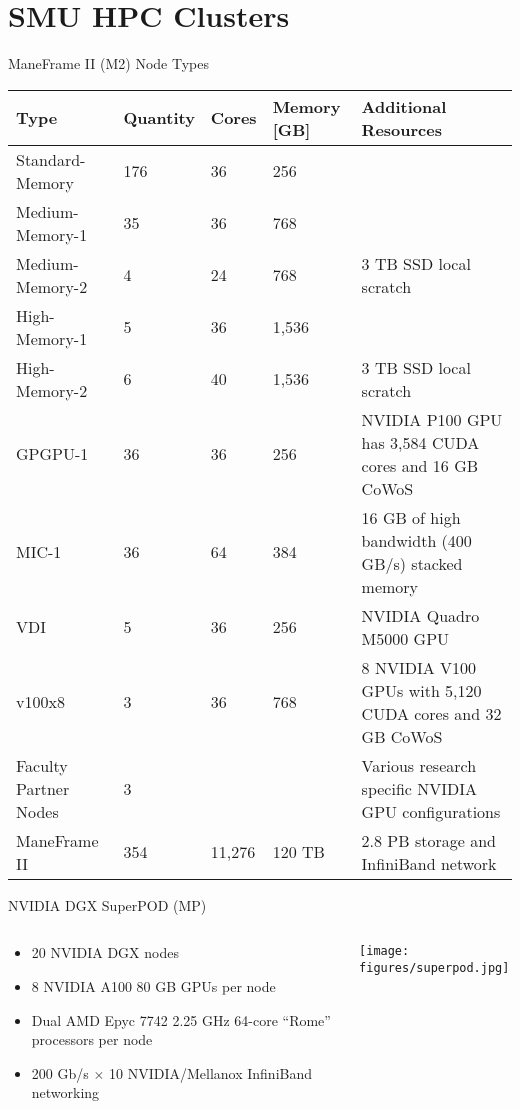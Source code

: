 \section{SMU HPC Clusters}

\begin{frame}{ManeFrame II (M2) Node Types}
\begin{table}
\tiny
\begin{tabular}{lllll}
\toprule
Type & Quantity & Cores & Memory [GB] & Additional Resources\\
\midrule
Standard-Memory & 176 & 36 & 256 & \\
Medium-Memory-1 & 35 & 36 & 768 & \\
Medium-Memory-2 & 4 & 24 & 768 & 3 TB SSD local scratch\\
High-Memory-1 & 5 & 36 & 1,536 & \\
High-Memory-2 & 6 & 40 & 1,536 & 3 TB SSD local scratch\\
GPGPU-1 & 36 & 36 & 256 & NVIDIA P100 GPU has 3,584 CUDA cores and 16 GB CoWoS\\
MIC-1 & 36 & 64 & 384 & 16 GB of high bandwidth (400 GB/s) stacked memory\\
VDI & 5 & 36 & 256 & NVIDIA Quadro M5000 GPU\\
v100x8 & 3 & 36 & 768 & 8 NVIDIA V100 GPUs with 5,120 CUDA cores and 32 GB CoWoS\\
Faculty Partner Nodes & 3 &  &  & Various research specific NVIDIA GPU configurations\\
\midrule
ManeFrame II & 354 & 11,276 & 120 TB & 2.8 PB storage and InfiniBand network\\
\bottomrule
\end{tabular}
\end{table}
\end{frame}

\begin{frame}{NVIDIA DGX SuperPOD (MP)}
\begin{columns}
\begin{column}{0.5\textwidth}
\begin{itemize}
\item 20 NVIDIA DGX nodes
\item 8 NVIDIA A100 80 GB GPUs per node
\item Dual AMD Epyc 7742 2.25 GHz 64-core ``Rome'' processors per node
\item 200 Gb/s \(\times\) 10 NVIDIA/Mellanox InfiniBand networking
\end{itemize}
\end{column}
\begin{column}{0.5\textwidth}
\begin{center}
\texttt{[image: figures/superpod.jpg]}
\end{center}
\end{column}
\end{columns}
\end{frame}

